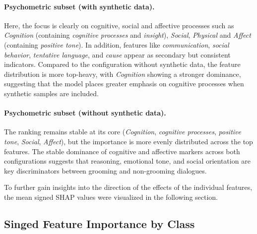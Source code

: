 \paragraph{Psychometric subset (with synthetic data).}
Here, the focus is clearly on cognitive, social and affective processes such as \textit{Cognition} (containing \textit{cognitive processes} and \textit{insight}), \textit{Social}, \textit{Physical} and \textit{Affect} (containing \textit{positive tone}). In addition, features like \textit{communication}, \textit{social behavior}, \textit{tentative language}, and \textit{cause} appear as secondary but consistent indicators. Compared to the configuration without synthetic data, the feature distribution is more top-heavy, with \textit{Cognition} showing a stronger dominance, suggesting that the model places greater emphasis on cognitive processes when synthetic samples are included.

\paragraph{Psychometric subset (without synthetic data).}
The ranking remains stable at its core (\textit{Cognition}, \textit{cognitive processes}, \textit{positive tone}, \textit{Social},  \textit{Affect}), but the importance is more evenly distributed across the top features. The stable dominance of cognitive and affective markers across both configurations suggests that reasoning, emotional tone, and social orientation are key discriminators between grooming and non-grooming dialogues.

To further gain insights into the direction of the effects of the individual features, the mean signed SHAP values were visualized in the following section.


\subsection{Singed Feature Importance by Class}

